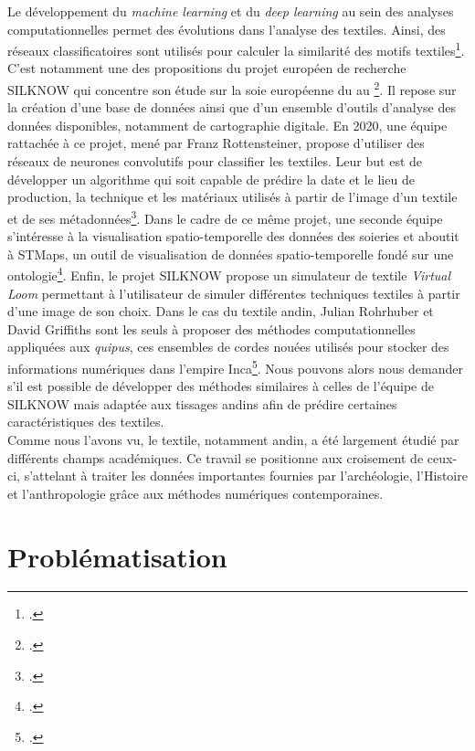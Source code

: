 Le développement du \textit{machine learning} et du \textit{deep learning} au sein des analyses computationnelles permet des évolutions dans l'analyse des textiles. Ainsi, des réseaux classificatoires sont utilisés pour calculer la similarité des motifs textiles\footcite{xiangFabricImageRetrieval2019}. C'est notamment une des propositions du projet européen de recherche \textsc{SILKNOW} qui concentre son étude sur la soie européenne du  au \footcite{SILKNOWSILK}. Il repose sur la création d'une base de données ainsi que d'un ensemble d'outils d'analyse des données disponibles, notamment de cartographie digitale. En 2020, une équipe rattachée à ce projet, mené par Franz Rottensteiner, propose d'utiliser des réseaux de neurones convolutifs pour classifier les textiles. Leur but est de développer un algorithme qui soit capable de prédire la date et le lieu de production, la technique et les matériaux utilisés à partir de l'image d'un textile et de ses métadonnées\footcite{clermontAssessingSemanticSimilarity2020}. Dans le cadre de ce même projet, une seconde équipe s'intéresse à la visualisation spatio-temporelle des données des soieries et aboutit à STMaps, \og un outil de visualisation de données spatio-temporelle fondé sur une ontologie\fg\footcite{sevillaMultiPurposeOntologyBasedVisualization2021}. Enfin, le projet \textsc{SILKNOW} propose un simulateur de textile \textit{Virtual Loom} permettant à l'utilisateur de simuler différentes techniques textiles à partir d'une image de son choix. Dans le cas du textile andin, Julian Rohrhuber et David Griffiths sont les seuls à proposer des méthodes computationnelles appliquées aux \textit{quipus}, ces ensembles de cordes nouées utilisés pour stocker des informations numériques dans l'empire Inca\footcite{rohrhuberCodingKnots2017}. Nous pouvons alors nous demander s'il est possible de développer des méthodes similaires à celles de l'équipe de SILKNOW mais adaptée aux tissages andins afin de prédire certaines caractéristiques des textiles.\\

Comme nous l'avons vu, le textile, notamment andin, a été largement étudié par différents champs académiques. Ce travail se positionne aux croisement de ceux-ci, s'attelant à traiter les données importantes fournies par l'archéologie, l'Histoire et l'anthropologie grâce aux méthodes numériques contemporaines.

\section*{Problématisation}

